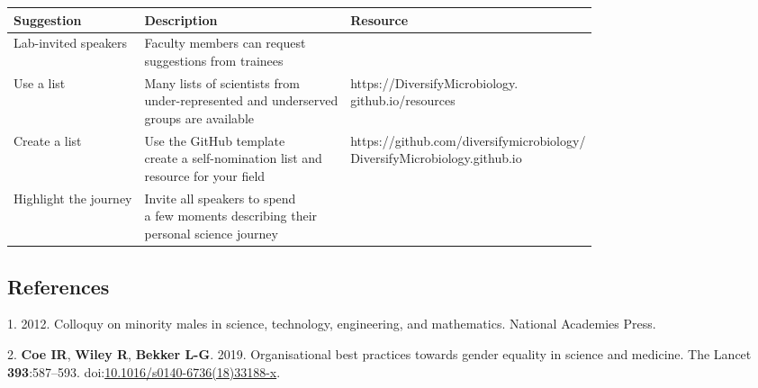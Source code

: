 \documentclass[10pt,]{article}
\begin{document}
\begin{center}
\small
\begin{tabular}{|l|l|l|}
\hline

\rowcolor{lightgray}
\textbf{Suggestion} & \textbf{Description} & \textbf{Resource} \\ \hline

Lab-invited speakers & \makecell[l]{Faculty members can request \\suggestions from trainees} & \\ \hline

Use a list & \makecell[l]{Many lists of scientists from \\under-represented and underserved \\groups are available} &  \makecell[l]{https://DiversifyMicrobiology.\\github.io/resources}\\ \hline

Create a list & \makecell[l]{Use the GitHub template \\ create a self-nomination list and \\resource for your field} & \makecell[l]{https://github.com/diversifymicrobiology/\\DiversifyMicrobiology.github.io} \\ \hline

Highlight the journey & \makecell[l]{Invite all speakers to spend \\a few moments describing their \\personal science journey} & \\ \hline

\end{tabular}
\end{center}

\newpage

\subsection{References}\label{references}

\hypertarget{refs}{}
\hypertarget{ref-colloquy_2012}{}
1. 2012. Colloquy on minority males in science, technology, engineering,
and mathematics. National Academies Press.

\hypertarget{ref-Coe2019}{}
2. \textbf{Coe IR}, \textbf{Wiley R}, \textbf{Bekker L-G}. 2019.
Organisational best practices towards gender equality in science and
medicine. The Lancet \textbf{393}:587--593.
doi:\href{https://doi.org/10.1016/s0140-6736(18)33188-x}{10.1016/s0140-6736(18)33188-x}.
\end{document}
